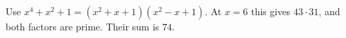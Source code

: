 Use $x^4+x^2+1=(x^2+x+1)(x^2-x+1)$. At $x=6$ this gives $43\cdot31$, and both factors are prime. Their sum is $\boxed{74}$.
